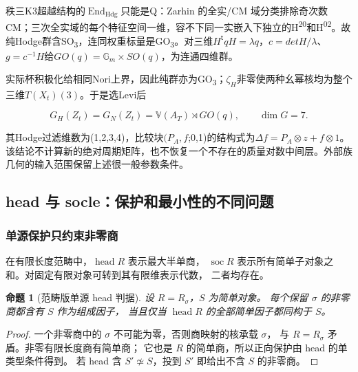 \documentclass[11pt,a4paper,oneside]{ctexart}
\theoremstyle{cnplain}
\newtheorem{proposition}[theorem]{命题}
\theoremstyle{definition}
\theoremstyle{remark}
\newcommand{\Q}{\mathbb Q}
\newcommand{\C}{\mathbb C}
\newcommand{\End}{\operatorname{End}}
\newcommand{\Hom}{\operatorname{Hom}}
\newcommand{\rank}{\operatorname{rank}}
\newcommand{\im}{\operatorname{im}}
\newcommand{\id}{\operatorname{id}}
\newcommand{\dR}{\mathrm{dR}}
\numberwithin{equation}{section}
\begin{document}
秩三K3超越结构的\(\operatorname{End}_{\mathrm{Hdg}}\)只能是Q：Zarhin 的全实/CM 域分类\cite{zarhin}排除奇次数CM；三次全实域的每个特征空间一维，容不下同一实嵌入下独立的H\textsuperscript{20}和H\textsuperscript{02}。故纯Hodge群含SO\textsubscript{3}，连同权重标量是GO\textsubscript{3}。对三维\(H^{\mathsf t}qH=\lambda q\)，\(c=detH/\lambda \)、\(g=c^{-1}H\)给\(GO(q)=\mathbb G_m\times SO(q)\)，为连通四维群。

实际杯积极化给相同Nori上界，因此纯群亦为GO\textsubscript{3}；\(\zeta _H\)非零使两种幺幂核均为整个三维\(T(X_t)(3)\)。于是选Levi后

\begin{equation}
G_H(Z_t)=G_N(Z_t)=\mathbb V(A_T)\rtimes GO(q),
                    \qquad\dim G=7.
\end{equation}

其Hodge过滤维数为(1,2,3,4)，比较块\((P_A,f\);0,1)的结构式为\(\Delta f=P_A\otimes z+f\otimes 1\)。该结论不计算新的绝对周期矩阵，也不恢复一个不存在的质量对数中间层。外部族几何的输入范围保留上述很一般参数条件。



\endgroup

\begingroup
\providecommand{\Q}{\mathbb Q}
\providecommand{\C}{\mathbb C}
\providecommand{\dR}{\mathrm{dR}}
\providecommand{\id}{\operatorname{id}}
\providecommand{\im}{\operatorname{im}}
\providecommand{\End}{\operatorname{End}}
\providecommand{\Hom}{\operatorname{Hom}}
\providecommand{\Vis}{\operatorname{Vis}}
\providecommand{\soc}{\operatorname{soc}}
\providecommand{\head}{\operatorname{head}}
\providecommand{\rank}{\operatorname{rank}}
\subsection{head 与 socle：保护和最小性的不同问题}
\subsubsection{单源保护只约束非零商}
在有限长度范畴中，$\head R$ 表示最大半单商，
$\soc R$ 表示所有简单子对象之和。对固定有限对象可转到其有限维表示代数，
二者均存在。

\begin{proposition}[范畴版单源 head 判据]\label{ops:prop:head}
设 $R=R_\sigma$，$S$ 为简单对象。
每个保留 $\sigma$ 的非零商都含有 $S$ 作为组成因子，
当且仅当 $\head R$ 的全部简单因子都同构于 $S$。
\end{proposition}
\begin{proof}
一个非零商中的 $\sigma$ 不可能为零，否则商映射的核承载 $\sigma$，
与 $R=R_\sigma$ 矛盾。非零有限长度商有简单商；
它也是 $R$ 的简单商，所以正向保护由 head 的单类型条件得到。
若 head 含 $S'\not\simeq S$，投到 $S'$ 即给出不含 $S$ 的非零商。
\end{proof}
\end{document}
